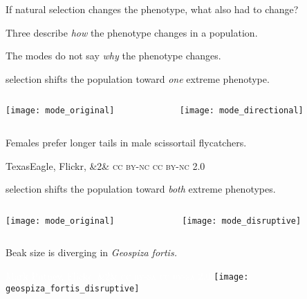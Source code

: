 \documentclass[t,handout]{beamer}  %
\newcommand{\ccbysa}[1]{%
	\ifx&#1&
	{\textsc{cc by-sa}}%
\else
	{\textsc{cc by-sa #1.0}} 
\fi}
\newcommand{\ccbync}[1]{%
	\ifx&#1&
	{\textsc{cc by-nc}}%
\else
	{\textsc{cc by-nc #1.0}}
\fi}
\begin{document}
\begin{frame}[t]{If natural selection changes the phenotype, what also had to change?}

\hangpara Three  describe \emph{how} the phenotype changes in a population.

\hangpara The modes do not say \emph{why} the phenotype changes.

\end{frame}
%
\begin{frame}{ selection shifts the population toward \emph{one} extreme phenotype.}
	\centering
	\begin{columns}[T]
		\begin{column}{0.5\textwidth}
			\centering
			\texttt{[image: mode\_original]}
		\end{column}
		\begin{column}{0.5\textwidth}
			\pause\texttt{[image: mode\_directional]}
		\end{column}
	\end{columns}
\end{frame}
%
{
\begin{frame}[b]{Females prefer longer tails in male scissortail flycatchers.}

	\hfill\tiny{TexasEagle, Flickr, \ccbync{2}}

\end{frame}
}
%
\begin{frame}{ selection shifts the population toward \emph{both} extreme phenotypes.}
	\centering
	\begin{columns}[T]
		\begin{column}{0.5\textwidth}
			\centering
			\texttt{[image: mode\_original]}
		\end{column}
		\begin{column}{0.5\textwidth}
			\texttt{[image: mode\_disruptive]}
		\end{column}
	\end{columns}
\end{frame}
%
{
\begin{frame}[b,plain]{Beak size is diverging in \textit{Geospiza fortis.}}

	\tiny\textcolor{white}{Mark Putney, Flickr, \ccbysa{2}} \pause\hfill\texttt{[image: geospiza\_fortis\_disruptive]}

\end{frame}
}
\end{document}
